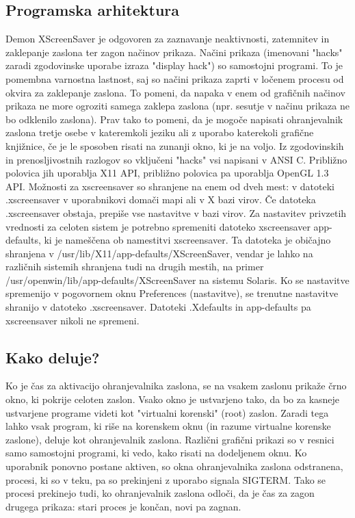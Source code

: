 \documentclass[11pt, oneside]{article}   	%
\begin{document}
\subsection{Programska arhitektura}
Demon XScreenSaver je odgovoren za zaznavanje neaktivnosti, zatemnitev in zaklepanje zaslona ter zagon načinov prikaza. Načini prikaza (imenovani "hacks" zaradi zgodovinske uporabe izraza "display hack") so samostojni programi.
\newline
To je pomembna varnostna lastnost, saj so načini prikaza zaprti v ločenem procesu od okvira za zaklepanje zaslona. To pomeni, da napaka v enem od grafičnih načinov prikaza ne more ogroziti samega zaklepa zaslona (npr. sesutje v načinu prikaza ne bo odklenilo zaslona).
\newline
Prav tako to pomeni, da je mogoče napisati ohranjevalnik zaslona tretje osebe v kateremkoli jeziku ali z uporabo katerekoli grafične knjižnice, če je le sposoben risati na zunanji okno, ki je na voljo.
\newline
Iz zgodovinskih in prenosljivostnih razlogov so vključeni "hacks" vsi napisani v ANSI C. Približno polovica jih uporablja X11 API, približno polovica pa uporablja OpenGL 1.3 API.
\newline
Možnosti za xscreensaver so shranjene na enem od dveh mest: v datoteki .xscreensaver v uporabnikovi domači mapi ali v X bazi virov. Če datoteka .xscreensaver obstaja, prepiše vse nastavitve v bazi virov.
\newline
Za nastavitev privzetih vrednosti za celoten sistem je potrebno spremeniti datoteko xscreensaver app-defaults, ki je nameščena ob namestitvi xscreensaver. Ta datoteka je običajno shranjena v /usr/lib/X11/app-defaults/XScreenSaver, vendar je lahko na različnih sistemih shranjena tudi na drugih mestih, na primer /usr/openwin/lib/app-defaults/XScreenSaver na sistemu Solaris.
\newline
Ko se nastavitve spremenijo v pogovornem oknu Preferences (nastavitve), se trenutne nastavitve shranijo v datoteko .xscreensaver. Datoteki .Xdefaults in app-defaults pa xscreensaver nikoli ne spremeni.

\subsection{Kako deluje?}
Ko je čas za aktivacijo ohranjevalnika zaslona, se na vsakem zaslonu prikaže črno okno, ki pokrije celoten zaslon. Vsako okno je ustvarjeno tako, da bo za kasneje ustvarjene programe videti kot "virtualni korenski" (root) zaslon. Zaradi tega lahko vsak program, ki riše na korenskem oknu (in razume virtualne korenske zaslone), deluje kot ohranjevalnik zaslona. Različni grafični prikazi so v resnici samo samostojni programi, ki vedo, kako risati na dodeljenem oknu.
\newline
Ko uporabnik ponovno postane aktiven, so okna ohranjevalnika zaslona odstranena, procesi, ki so v teku, pa so prekinjeni z uporabo signala SIGTERM. Tako se procesi prekinejo tudi, ko ohranjevalnik zaslona odloči, da je čas za zagon drugega prikaza: stari proces je končan, novi pa zagnan.
\newline
\end{document}

